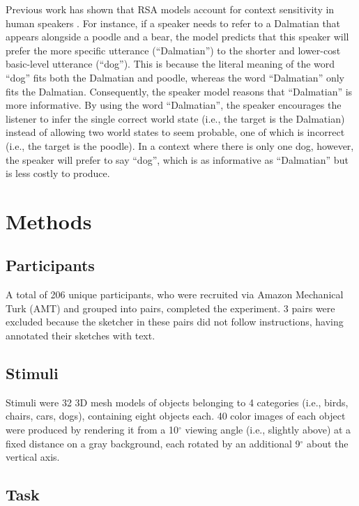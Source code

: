\documentclass[manuscript]{stjour}
\begin{document}
Previous work has shown that RSA models account for context sensitivity in human speakers \cite[]{GrafEtAl16_BasicLevel}. For instance, if a speaker needs to refer to a Dalmatian that appears alongside a poodle and a bear, the model predicts that this speaker will prefer the more specific utterance (``Dalmatian'') to the shorter and lower-cost basic-level utterance (``dog''). This is because the literal meaning of the word ``dog'' fits both the Dalmatian and poodle, whereas the word ``Dalmatian'' only fits the Dalmatian. Consequently, the speaker model reasons that ``Dalmatian'' is more informative. By using the word ``Dalmatian'', the speaker encourages the listener to infer the single correct world state (i.e., the target is the Dalmatian) instead of allowing two world states to seem probable, one of which is incorrect (i.e., the target is the poodle). In a context where there is only one dog, however, the speaker will prefer to say ``dog'', which is as informative as ``Dalmatian'' but is less costly to produce. 

\section*{Methods}

\subsection*{Participants}

A total of 206 unique participants, who were recruited via Amazon Mechanical Turk (AMT) and grouped into pairs, completed the experiment. 3 pairs were excluded because the sketcher in these pairs did not follow instructions, having annotated their sketches with text. 

\subsection*{Stimuli}

Stimuli were 32 3D mesh models of objects belonging to 4 categories (i.e., birds, chairs, cars, dogs), containing eight objects each. 40 color images of each object were produced by rendering it from a 10$^{\circ}$ viewing angle (i.e., slightly above) at a fixed distance on a gray background, each rotated by an additional 9$^{\circ}$ about the vertical axis. 

\subsection*{Task}
\end{document}
